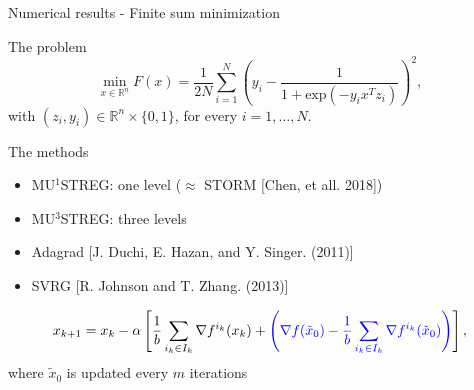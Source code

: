\documentclass{beamer}
\begin{document}
\begin{frame}{Numerical results - Finite sum minimization}
\begin{block}{The problem}
\begin{equation*}
    \min_{x \in  \mathbb{R}^n}  F(x) =  \frac{1}{2N}\sum_{i=1}^N (y_i - \frac{1}{1 + \text{exp}(-y_ix^Tz_i)})^2,
\end{equation*}
with $(z_i,y_i)\in \mathbb{R}^n \times \{0,1\}$, for every $i=1,\dots,N$. 
\end{block}
\vspace{0.3cm}
\begin{block}{The methods}
\begin{itemize}
\item MU$^1$STREG: one level ($\approx$ STORM [Chen, et all. 2018])
\item MU$^3$STREG: three levels
\item Adagrad [J. Duchi, E. Hazan, and Y. Singer. (2011)]
\item SVRG [R. Johnson and T. Zhang. (2013)]
\end{itemize}
$$x_{k+1}=x_k-\alpha\left[\frac{1}{b}\sum_{i_k\in I_k}\nabla f^{i_k}(x_k) +\textcolor{blue}{ \left(\nabla f(\tilde{x}_0)-\frac{1}{b}\sum_{i_k\in I_k}\nabla f^{i_k}(\tilde{x}_0)\right)}\right],$$ 
where $\tilde{x}_0$ is updated every $m$ iterations 
\end{block}
	\end{frame}
\end{document}

